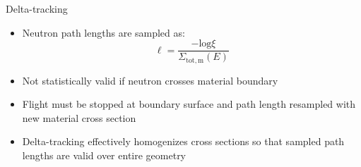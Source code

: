 \documentclass[final]{beamer}
\begin{document}
\begin{frame}{}
\begin{columns}[t]
\begin{column}{.3\linewidth}
\begin{block}{\large Delta-tracking}
\begin{itemize}
		\item{Neutron path lengths are sampled as:}
			\begin{equation*}
			\ell = \frac{-\mathrm{log}\xi}{\Sigma_{\mathrm{tot,m}}(E)}
			\end{equation*}
		\item{Not statistically valid if neutron crosses material boundary}
		\item{Flight must be stopped at boundary surface and path length resampled with new material cross section}
		\item{Delta-tracking effectively homogenizes cross sections so that sampled path lengths are valid over entire geometry \cite{serpent}}
		\end{itemize}
        	\end{block}
    	\end{column}



\end{columns}
\end{frame}
\end{document}
